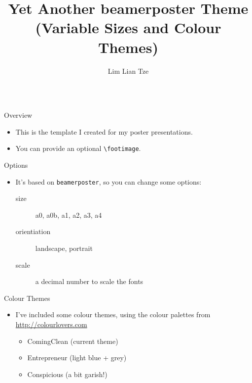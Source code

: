 \documentclass{beamer}
\author[liantze@gmail.com]{Lim Lian Tze}
\title{Yet Another beamerposter Theme\\(Variable Sizes and Colour Themes)}
\institute{Your Institution}
\begin{document}
\begin{frame}[fragile]\centering

\begin{columns}[T]

\begin{column}{.46\textwidth}

\begin{block}{Overview}
\begin{itemize}
\item This is the template I created for my poster presentations.
\item You can provide an optional \verb|\footimage|.
\end{itemize}
\end{block}

\begin{block}{Options}
\begin{itemize}
\item It's based on \texttt{beamerposter}, so you can change some options:
  \begin{description}
  \item[size] a0, a0b, a1, a2, a3, a4
  \item[orientiation] landscape, portrait
  \item[scale] a decimal number to scale the fonts
  \end{description}
\end{itemize}
\end{block}

\begin{block}{Colour Themes}
\begin{itemize}
\item I've included some colour themes, using the colour palettes from \url{http://colourlovers.com}
\begin{itemize}
\item ComingClean (current theme)
\item Entrepreneur (light blue + grey)
\item Conspicious (a bit garish!)
\end{itemize}
\end{itemize}
\end{block}

\end{column}

\begin{column}{.46\textwidth}


\end{column}
\end{columns}
\end{frame}
\end{document}
